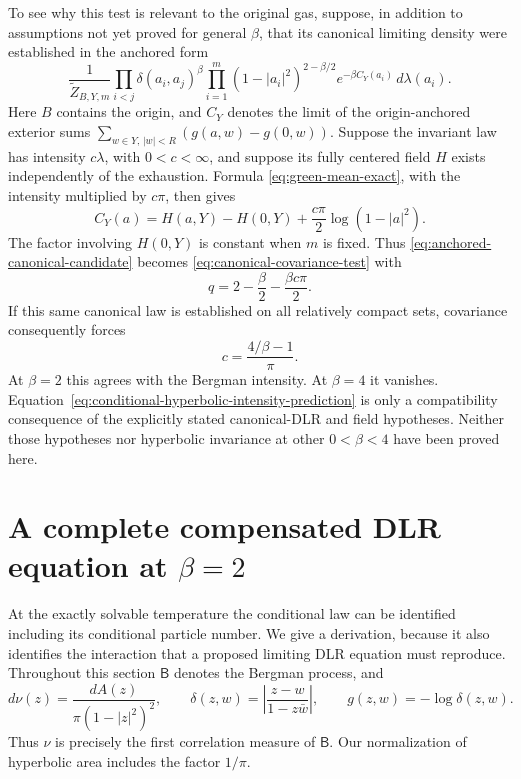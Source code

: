 \documentclass[11pt,a4paper]{article}
\numberwithin{equation}{section}
\theoremstyle{definition}
\theoremstyle{remark}
\begin{document}
To see why this test is relevant to the original gas, suppose, in
addition to assumptions not yet proved for general $\beta$, that its
canonical limiting density were established in the anchored form
\begin{equation}
 \frac1{\widetilde Z_{B,Y,m}}
 \prod_{i<j}\delta(a_i,a_j)^\beta
 \prod_{i=1}^m(1-|a_i|^2)^{2-\beta/2}
                  e^{-\beta C_Y(a_i)}\,d\lambda(a_i).
 \label{eq:anchored-canonical-candidate}
\end{equation}
Here $B$ contains the origin, and $C_Y$ denotes the limit of the
origin-anchored exterior sums
$\sum_{w\in Y,\,|w|<R}(g(a,w)-g(0,w))$. Suppose the invariant law has
intensity $c\lambda$, with $0<c<\infty$, and suppose its fully centered
field $H$ exists independently of the exhaustion. Formula
\eqref{eq:green-mean-exact}, with the intensity multiplied by $c\pi$,
then gives
\[
 C_Y(a)=H(a,Y)-H(0,Y)+\frac{c\pi}{2}\log(1-|a|^2).
\]
The factor involving $H(0,Y)$ is constant when $m$ is fixed. Thus
\eqref{eq:anchored-canonical-candidate} becomes
\eqref{eq:canonical-covariance-test} with
\[
 q=2-\frac\beta2-\frac{\beta c\pi}{2}.
\]
If this same canonical law is established on all relatively compact
sets, covariance consequently forces
\begin{equation}
 c=\frac{4/\beta-1}{\pi}.
 \label{eq:conditional-hyperbolic-intensity-prediction}
\end{equation}
At $\beta=2$ this agrees with the Bergman intensity. At $\beta=4$
it vanishes. Equation~\eqref{eq:conditional-hyperbolic-intensity-prediction}
is only a compatibility consequence of the explicitly stated
canonical-DLR and field hypotheses. Neither those hypotheses nor
hyperbolic invariance at other $0<\beta<4$ have been proved here.

\section{A complete compensated DLR equation at \texorpdfstring{$\beta=2$}{beta=2}}
\label{sec:bergman-complete-dlr}

At the exactly solvable temperature the conditional law can be identified
including its conditional particle number.  We give a derivation, because
it also identifies the interaction that a proposed limiting DLR equation
must reproduce.  Throughout this section $\mathsf B$ denotes the Bergman
process, and
\[
 d\nu(z)=\frac{dA(z)}{\pi(1-|z|^2)^2},\qquad
 \delta(z,w)=\left|\frac{z-w}{1-z\bar w}\right|,
 \qquad g(z,w)=-\log\delta(z,w).
\]
Thus $\nu$ is precisely the first correlation measure of $\mathsf B$.
Our normalization of hyperbolic area includes the factor $1/\pi$.
\end{document}
